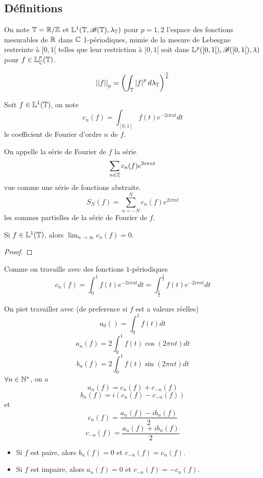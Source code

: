 \subsection{Définitions}


\begin{definition}
	On note $\mathbb{T} = \mathbb{R} / \mathbb{Z}$ et $\mathbb{L}^1(\mathbb{T}, \mathscr{B} (\mathbb{T}), \lambda_{\mathbb{T}})$ pour $p = 1,2$ l'espace des fonctions mesurables de $\mathbb{R}$ dans $\mathbb{C}$ 1-périodiques, munie de la mesure de Lebesgue restreinte à $[0,1[$
	telles que leur restriction à $[0,1[$ soit dans $\mathbb{L}^p([0,1[), \mathscr{B}([0,1[), \lambda)$ pour $f \in \mathbb{L}_{\mathbb{C}}^p(\mathbb{T})$.

	$$ {\left|\left|f\right|\right|}_p = \left( \int_{\mathbb{T}} \left|f\right|^p d\lambda_{\mathbb{T}} \right)^{\frac{1}{p}} $$
\end{definition}

\begin{definition}
	Soit $f \in \mathbb{L}^1(\mathbb{T})$, on note
	$$ c_n(f) = \int_{[0,1]} f(t) e^{-2i\pi nt} dt $$
	le coefficient de Fourier d'ordre $n$ de $f$.

	On appelle la série de Fourier de $f$ la série
	$$ \sum_{n \in \mathbb{Z}} c_n(f) e^{2i\pi nt} $$
	vue comme une série de fonctions abstraite.
	$$ S_N(f) = \sum_{n = -N}^{N} c_n(f) e^{2i\pi nt} $$
	les sommes partielles de la série de Fourier de $f$.
\end{definition}

\begin{prop}
	Si $f \in \mathbb{L}^1(\mathbb{T})$, alors $\lim_{n \to \infty} c_n(f) = 0$.
\end{prop}

\begin{proof}
\end{proof}

\begin{remarque}
	Comme on travaille avec des fonctions $1$-périodiques
	$$ c_n(f) = \int_0^1 f(t) e^{-2i\pi nt} dt  = \int_{\frac{1}{2}}^{\frac{1}{2}} f(t) e^{-2i\pi nt} dt $$
\end{remarque}



\begin{definition}
	On piet travailler avec (de preference si $f$ est a valeurs réelles)
	$$ a_0() = \int_0^1 f(t) dt $$
	$$ a_n(f) = 2\int_0^1 f(t) \cos(2\pi nt) dt $$
	$$ b_n(f) = 2\int_0^1 f(t) \sin(2\pi nt) dt $$
	$\forall n \in \mathbb{N}^*$, on a
	$$ a_n(f) = c_n(f) + c_{-n}(f) $$
	$$ b_n(f) = i(c_n(f) - c_{-n}(f)) $$
	et
	$$ c_n(f) = \frac{a_n(f) - ib_n(f)}{2} $$
	$$ c_{-n}(f) = \frac{a_n(f) + ib_n(f)}{2} $$
\end{definition}


\begin{prop}[Parité]
	\begin{itemize}
		\item Si $f$ est paire, alors $b_n(f) = 0$ et $c_{-n}(f) = c_n(f)$.
		\item Si $f$ est impaire, alors $a_n(f) = 0$ et $c_{-n}(f) = -c_n(f)$.
	\end{itemize}
\end{prop}
